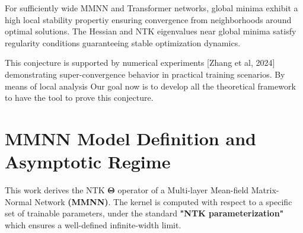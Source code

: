 \documentclass[a4paper]{article}
\theoremstyle{plain}
\theoremstyle{definition}
\theoremstyle{remark}
\begin{document}
\begin{tcolorbox}[colback=green!15,colframe=green!80!black,title={\textbf{Conjecture from Pr Haizhao Yang: Global Minima Stability}},enhanced,drop shadow,boxrule=2pt]
For sufficiently wide MMNN and Transformer networks, global minima exhibit a high local stability propertiy ensuring convergence from neighborhoods around optimal solutions. The Hessian and NTK eigenvalues near global minima satisfy regularity conditions guaranteeing stable optimization dynamics.
\end{tcolorbox}




This conjecture is supported by numerical experiments [Zhang et al, 2024] demonstrating super-convergence behavior in practical training scenarios.
By means of local analysis
Our goal now is to develop all the theoretical framework to have the tool to prove this conjecture.


\section{MMNN Model Definition and Asymptotic Regime}

\begin{tcolorbox}[colback=green!15,colframe=green!80!black,title={\textbf{Objective and Scope}},enhanced,drop shadow,boxrule=2pt]
This work derives the NTK $\boldsymbol{\Theta}$ operator of a Multi-layer Mean-field Matrix-Normal Network \textbf{(MMNN)}. 
The kernel is computed with respect to a specific set of trainable parameters, under the standard \textbf{"NTK parameterization"} 
which ensures a well-defined infinite-width limit.
\end{tcolorbox}
\end{document}
